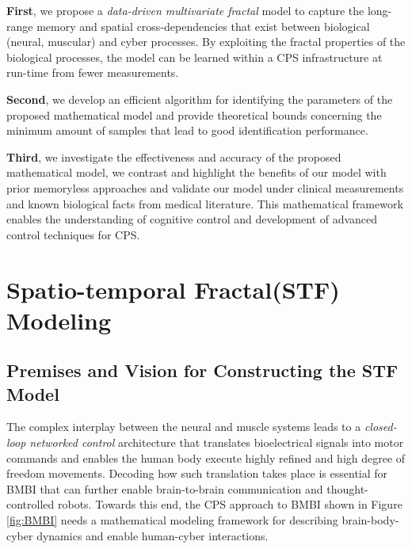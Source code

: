 \indent \textbf{First}, we propose a \textit{data-driven multivariate fractal} model to capture the long-range memory and spatial cross-dependencies that exist between biological (neural, muscular) and cyber processes. By exploiting the fractal properties of the biological processes, the model can be learned within a CPS infrastructure at run-time from fewer measurements.

\indent \textbf{Second}, we develop an efficient algorithm for identifying the parameters of the proposed mathematical model and provide theoretical bounds concerning the minimum amount of samples that lead to good identification performance.

\indent \textbf{Third}, we investigate the effectiveness and accuracy of the proposed mathematical model, we contrast and highlight the benefits of our model with prior memoryless approaches and validate our model under clinical measurements and known biological facts from medical literature. This mathematical framework enables the understanding of cognitive control and development of advanced control techniques for CPS.   
\section{Spatio-temporal Fractal(STF) Modeling}
\subsection{Premises and Vision for Constructing the STF Model}
The complex interplay between the neural and muscle systems leads to a \textit{closed-loop networked control} architecture that translates bioelectrical signals into motor commands and enables the human body execute highly refined and high degree of freedom movements. Decoding how such translation takes place is essential for BMBI that can further enable brain-to-brain communication and thought-controlled robots. Towards this end, the CPS approach to BMBI shown in Figure \ref{fig:BMBI} needs a mathematical modeling framework for describing brain-body-cyber dynamics and enable human-cyber interactions.

